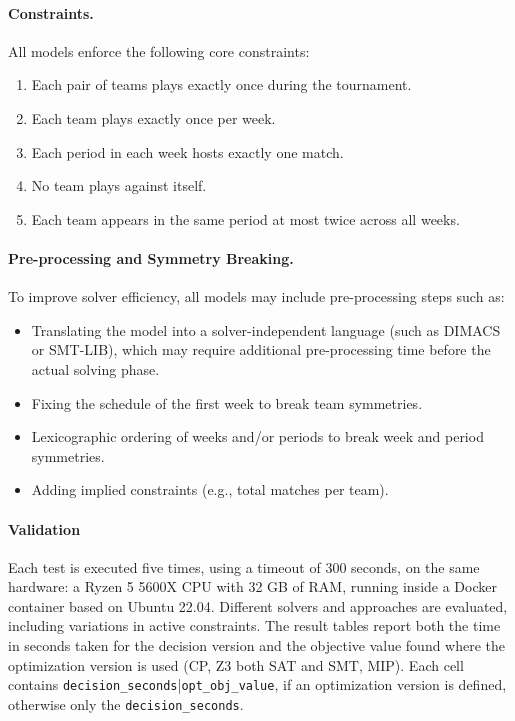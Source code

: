 \documentclass[11pt]{article}
\begin{document}
\paragraph{Constraints.}
All models enforce the following core constraints:
\begin{enumerate}
    \item Each pair of teams plays exactly once during the tournament.
    \item Each team plays exactly once per week.
    \item Each period in each week hosts exactly one match.
    \item No team plays against itself.
    \item Each team appears in the same period at most twice across all weeks.
\end{enumerate}

\paragraph{Pre-processing and Symmetry Breaking.}
To improve solver efficiency, all models may include pre-processing steps such as:
\begin{itemize}
    \item Translating the model into a solver-independent language (such as DIMACS or SMT-LIB), which may require additional pre-processing time before the actual solving phase. 
    \item Fixing the schedule of the first week to break team symmetries.
    \item Lexicographic ordering of weeks and/or periods to break week and period symmetries.
    \item Adding implied constraints (e.g., total matches per team).
\end{itemize}

\paragraph{Validation}
Each test is executed five times, using a timeout of 300 seconds, on the same hardware: a Ryzen 5 5600X CPU with 32 GB of RAM, running inside a Docker container based on Ubuntu 22.04. Different solvers and approaches are evaluated, including variations in active constraints. The result tables report both the time in seconds taken for the decision version and the objective value found where the optimization version is used (CP, Z3 both SAT and SMT, MIP). Each cell contains \texttt{decision\_seconds}|\texttt{opt\_obj\_value}, if an optimization version is defined, otherwise only the \texttt{decision\_seconds}.
\end{document}
